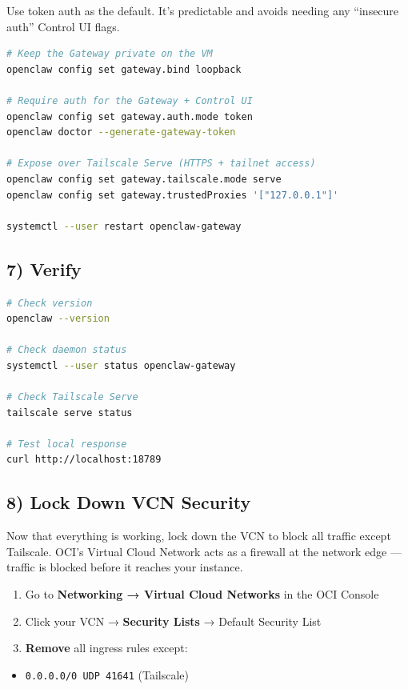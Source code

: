 Use token auth as the default. It’s predictable and avoids needing any “insecure auth” Control UI flags.

\begin{lstlisting}[language=bash]
# Keep the Gateway private on the VM
openclaw config set gateway.bind loopback

# Require auth for the Gateway + Control UI
openclaw config set gateway.auth.mode token
openclaw doctor --generate-gateway-token

# Expose over Tailscale Serve (HTTPS + tailnet access)
openclaw config set gateway.tailscale.mode serve
openclaw config set gateway.trustedProxies '["127.0.0.1"]'

systemctl --user restart openclaw-gateway
\end{lstlisting}


\subsection{7) Verify}


\begin{lstlisting}[language=bash]
# Check version
openclaw --version

# Check daemon status
systemctl --user status openclaw-gateway

# Check Tailscale Serve
tailscale serve status

# Test local response
curl http://localhost:18789
\end{lstlisting}


\subsection{8) Lock Down VCN Security}


Now that everything is working, lock down the VCN to block all traffic except Tailscale. OCI's Virtual Cloud Network acts as a firewall at the network edge — traffic is blocked before it reaches your instance.

\begin{enumerate}
  \item Go to \textbf{Networking → Virtual Cloud Networks} in the OCI Console
  \item Click your VCN → \textbf{Security Lists} → Default Security List
  \item \textbf{Remove} all ingress rules except:
\end{enumerate}

\begin{itemize}
  \item \texttt{0.0.0.0/0 UDP 41641} (Tailscale)
\end{itemize}

